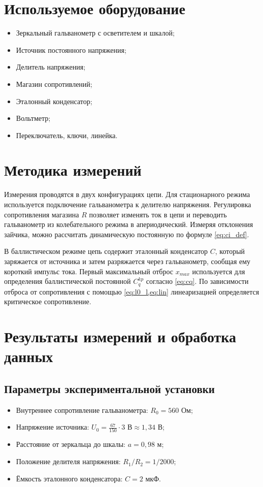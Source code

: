 \documentclass[a4paper,12pt]{article}
\begin{document}
\section{Используемое оборудование}
\begin{itemize}
    \item Зеркальный гальванометр с осветителем и шкалой;
    \item Источник постоянного напряжения;
    \item Делитель напряжения;
    \item Магазин сопротивлений;
    \item Эталонный конденсатор;
    \item Вольтметр;
    \item Переключатель, ключи, линейка.
\end{itemize}

\section{Методика измерений}
Измерения проводятся в двух конфигурациях цепи. Для стационарного режима используется подключение гальванометра к делителю напряжения. Регулировка сопротивления магазина $R$ позволяет изменять ток в цепи и переводить гальванометр из колебательного режима в апериодический. Измеряя отклонения зайчика, можно рассчитать динамическую постоянную по формуле \cref{eq:ci_def}.

В баллистическом режиме цепь содержит эталонный конденсатор $C$, который заряжается от источника и затем разряжается через гальванометр, сообщая ему короткий импульс тока. Первый максимальный отброс $x_{max}$ используется для определения баллистической постоянной $C_q^{kp}$ согласно \cref{eq:cq}. По зависимости отброса от сопротивления с помощью \cref{eq:l0_l,eq:lin} линеаризацией определяется критическое сопротивление.

\section{Результаты измерений и обработка данных}

\subsection{Параметры экспериментальной установки}
\begin{itemize}
    \item Внутреннее сопротивление гальванометра: $R_0 = 560$ Ом;
    \item Напряжение источника: $U_0 = \frac{67}{150}\cdot3\text{ В}\approx1,34$ В;
    \item Расстояние от зеркальца до шкалы: $a = 0,98$ м;
    \item Положение делителя напряжения: $R_1/R_2 = 1 / 2000$;
    \item Ёмкость эталонного конденсатора: $C = 2$ мкФ.
\end{itemize}
\end{document}
